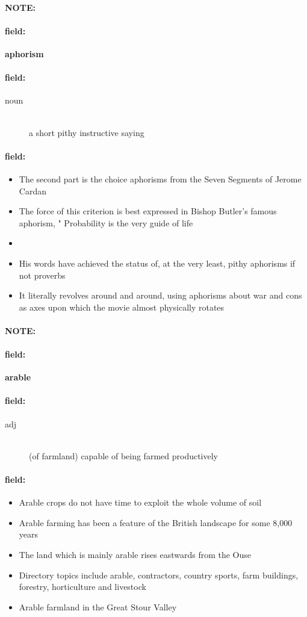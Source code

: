 \documentclass[12pt]{article}
\newenvironment{note}{\paragraph{NOTE:}}{}
\newenvironment{field}{\paragraph{field:}}{}
\begin{document}
\begin{note}
\begin{field}
\textbf{\large aphorism}
\end{field}


\begin{field}
\begin{description}
\item[noun] \hfill \\ 
a short pithy instructive saying

\end{description}
\end{field}

\begin{field}
\begin{itemize}
\item The second part is the choice aphorisms from the Seven Segments of Jerome Cardan
\item The force of this criterion is best expressed in Bishop Butler's famous aphorism, " Probability is the very guide of life
\item 
\item His words have achieved the status of, at the very least, pithy aphorisms if not proverbs
\item It literally revolves around and around, using aphorisms about war and cons as axes upon which the movie almost physically rotates
\end{itemize}
\end{field}
\end{note}
\begin{note}
\begin{field}
\textbf{\large arable}
\end{field}


\begin{field}
\begin{description}
\item[adj] \hfill \\ 
(of farmland) capable of being farmed productively

\end{description}
\end{field}

\begin{field}
\begin{itemize}
\item Arable crops do not have time to exploit the whole volume of soil
\item Arable farming has been a feature of the British landscape for some 8,000 years
\item The land which is mainly arable rises eastwards from the Ouse
\item Directory topics include arable, contractors, country sports, farm buildings, forestry, horticulture and livestock
\item Arable farmland in the Great Stour Valley
\end{itemize}
\end{field}
\end{note}
\end{document}
